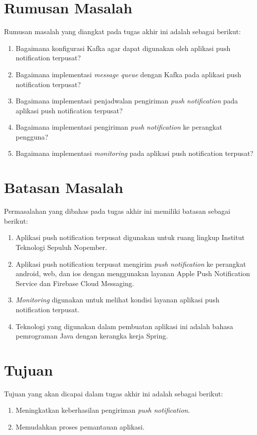 \section {Rumusan Masalah}
Rumusan masalah yang diangkat pada tugas akhir ini adalah sebagai berikut:
\begin {enumerate}
\item Bagaimana konfigurasi Kafka agar dapat digunakan oleh aplikasi push notification terpusat?
\item Bagaimana implementasi \textit{message queue} dengan Kafka pada aplikasi push notification terpusat?
\item Bagaimana implementasi penjadwalan pengiriman \textit{push notification} pada aplikasi push notification terpusat?
\item Bagaimana implementasi pengiriman \textit{push notification} ke perangkat pengguna?
\item Bagaimana implementasi \textit{monitoring} pada aplikasi push notification terpusat?
\end {enumerate}

\section {Batasan Masalah}
Permasalahan yang dibahas pada tugas akhir ini memiliki batasan sebagai berikut:
\begin {enumerate}
\item Aplikasi push notification terpusat digunakan untuk ruang lingkup Institut Teknologi Sepuluh Nopember.
\item Aplikasi push notification terpusat mengirim \textit{push notification} ke perangkat android, web, dan ios dengan menggunakan layanan Apple Push Notification Service dan Firebase Cloud Messaging.
\item \textit{Monitoring} digunakan untuk melihat kondisi layanan aplikasi push notification terpusat.
\item Teknologi yang digunakan dalam pembuatan aplikasi ini adalah bahasa pemrograman Java dengan kerangka kerja Spring.
\end {enumerate}

\section {Tujuan}
Tujuan yang akan dicapai dalam tugas akhir ini adalah sebagai berikut:
\begin{enumerate}
	\item Meningkatkan keberhasilan pengiriman \textit{push notification}.
	\item Memudahkan proses pemantauan aplikasi.
\end{enumerate}

